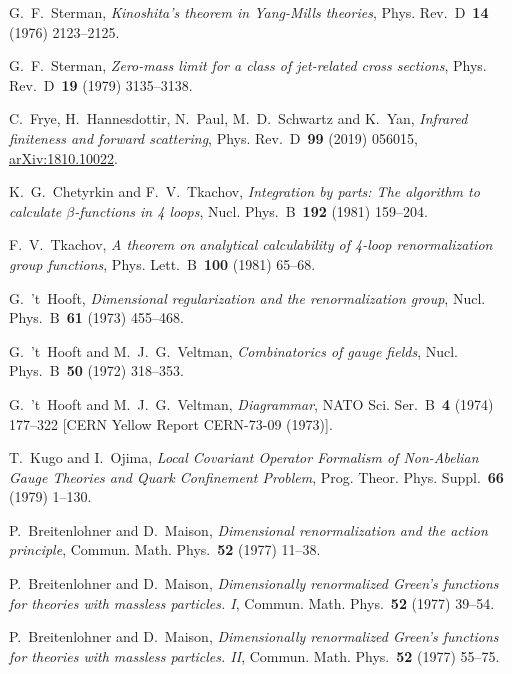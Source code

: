 G.~F.~Sterman, \emph{Kinoshita's theorem in Yang-Mills theories}, Phys. Rev.~D~\textbf{14} (1976) \mbox{2123--2125}.

G.~F.~Sterman, \emph{Zero-mass limit for a class of jet-related cross sections}, Phys. Rev.~D~\textbf{19} (1979) \mbox{3135--3138}.

C.~Frye, H.~Hannesdottir, N.~Paul, M.~D.~Schwartz and K.~Yan, \emph{Infrared finiteness and forward scattering}, Phys. Rev.~D~\textbf{99} (2019) \mbox{056015}, \href{https://arxiv.org/abs/1810.10022}{arXiv:1810.10022}.

K.~G.~Chetyrkin and F.~V.~Tkachov, \emph{Integration by parts: The algorithm to calculate $\beta$-functions in 4 loops}, Nucl. Phys.~B~\textbf{192} (1981) \mbox{159--204}.

F.~V.~Tkachov, \emph{A theorem on analytical calculability of 4-loop renormalization group functions}, Phys. Lett.~B~\textbf{100} (1981) \mbox{65--68}.

G.~'t~Hooft, \emph{Dimensional regularization and the renormalization group}, Nucl. Phys.~B~\textbf{61} (1973) \mbox{455--468}.

G.~'t~Hooft and M.~J.~G.~Veltman, \emph{Combinatorics of gauge fields}, Nucl. Phys.~B~\textbf{50} (1972) \mbox{318--353}.

G.~'t~Hooft and M.~J.~G.~Veltman, \emph{Diagrammar}, NATO Sci. Ser.~B~\textbf{4} (1974) \mbox{177--322} [CERN Yellow Report CERN-73-09 (1973)].

T.~Kugo and I.~Ojima, \emph{Local Covariant Operator Formalism of Non-Abelian Gauge Theories and Quark Confinement Problem}, Prog. Theor. Phys. Suppl.~\textbf{66} (1979) \mbox{1--130}.

P.~Breitenlohner and D.~Maison, \emph{Dimensional renormalization and the action principle}, Commun. Math. Phys.~\textbf{52} (1977) \mbox{11--38}.

P.~Breitenlohner and D.~Maison, \emph{Dimensionally renormalized Green's functions for theories with massless particles. I}, Commun. Math. Phys.~\textbf{52} (1977) \mbox{39--54}.

P.~Breitenlohner and D.~Maison, \emph{Dimensionally renormalized Green's functions for theories with massless particles. II}, Commun. Math. Phys.~\textbf{52} (1977) \mbox{55--75}.

